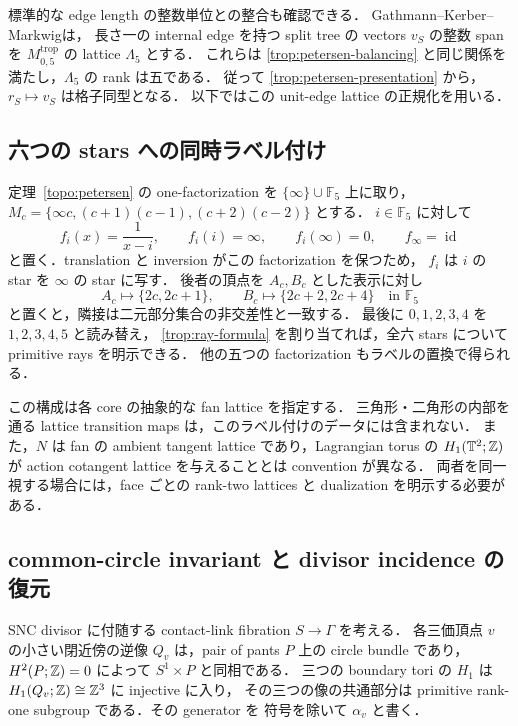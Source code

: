 標準的な edge length の整数単位との整合も確認できる．
Gathmann--Kerber--Markwig\cite[Construction 3.6, Theorem 3.7]{GKM}は，
長さ一の internal edge を持つ split tree の vectors $v_S$ の整数 span を
$M_{0,5}^{\mathrm{trop}}$ の lattice $\Lambda_5$ とする．
これらは \eqref{trop:petersen-balancing} と同じ関係を満たし，$\Lambda_5$ の rank は五である．
従って \eqref{trop:petersen-presentation} から，$r_S\mapsto v_S$ は格子同型となる．
以下ではこの unit-edge lattice の正規化を用いる．

\subsection{六つの stars への同時ラベル付け}

定理~\ref{topo:petersen} の one-factorization を
$\{\infty\}\cup\mathbb F_5$ 上に取り，
$M_c=\{\infty c,(c+1)(c-1),(c+2)(c-2)\}$ とする．
$i\in\mathbb F_5$ に対して
\[
 f_i(x)=\frac1{x-i},\qquad f_i(i)=\infty,\qquad f_i(\infty)=0,
 \qquad f_\infty=\operatorname{id}
\]
と置く．translation と inversion がこの factorization を保つため，
$f_i$ は $i$ の star を $\infty$ の star に写す．
後者の頂点を $A_c,B_c$ とした表示に対し
\begin{equation}\label{trop:kneser-labels}
 A_c\longmapsto\{2c,2c+1\},\qquad
 B_c\longmapsto\{2c+2,2c+4\}\quad\text{in }\mathbb F_5
\end{equation}
と置くと，隣接は二元部分集合の非交差性と一致する．
最後に $0,1,2,3,4$ を $1,2,3,4,5$ と読み替え，
\eqref{trop:ray-formula} を割り当てれば，全六 stars について primitive rays を明示できる．
他の五つの factorization もラベルの置換で得られる．

この構成は各 core の抽象的な fan lattice を指定する．
三角形・二角形の内部を通る lattice transition maps は，このラベル付けのデータには含まれない．
また，$N$ は fan の ambient tangent lattice であり，Lagrangian torus の
$H_1(\mathbb T^2;\mathbb Z)$ が action cotangent lattice を与えることとは convention が異なる．
両者を同一視する場合には，face ごとの rank-two lattices と dualization を明示する必要がある．

\subsection{common-circle invariant と divisor incidence の復元}

SNC divisor に付随する contact-link fibration $S\to\Gamma$ を考える．
各三価頂点 $v$ の小さい閉近傍の逆像 $Q_v$ は，pair of pants $P$ 上の circle bundle であり，
$H^2(P;\mathbb Z)=0$ によって $S^1\times P$ と同相である．
三つの boundary tori の $H_1$ は $H_1(Q_v;\mathbb Z)\cong\mathbb Z^3$ に injective に入り，
その三つの像の共通部分は primitive rank-one subgroup である．その generator を
符号を除いて $\alpha_v$ と書く．

